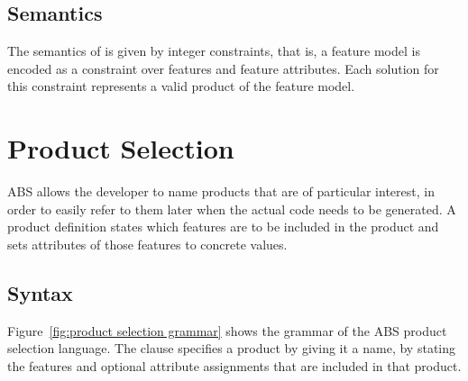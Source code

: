 \subsection{Semantics}

The semantics of \muTVL is given by integer constraints, that is, a feature
model is encoded as a constraint over features and feature attributes. Each
solution for this constraint represents a valid product of the feature model.


\section{Product Selection}
\label{sec:product selection}

ABS allows the developer to name products that are of particular interest, in
order to easily refer to them later when the actual code needs to be generated.
A product definition states which features are to be included in the product and
sets attributes of those features to concrete values.

\subsection{Syntax}
\label{sec:fsl syntax}

Figure~\ref{fig:product selection grammar} shows the grammar of the ABS product selection language. The 
clause specifies a product by giving it a name, by stating the features and
optional attribute assignments that are included in that product.


